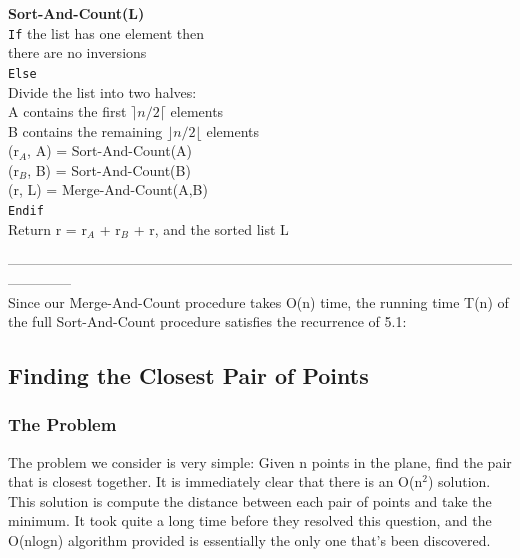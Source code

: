 \documentclass{article}
\begin{document}
\textbf{Sort-And-Count(L)}\\
\texttt{If} the list has one element then\\
there are no inversions\\
\texttt{Else}\\
Divide the list into two halves:\\
A contains the first $\rceil n/2 \lceil$ elements\\
B contains the remaining $\rfloor n/2 \lfloor$ elements\\
(r$_A$, A) = Sort-And-Count(A)\\
(r$_B$, B) = Sort-And-Count(B)\\
(r, L) = Merge-And-Count(A,B)\\
\texttt{Endif}\\
Return r = r$_A$ + r$_B$ + r, and the sorted list L

\medskip

--------------------------------------------------------------------------------------------------------------------------
\medskip
\\

Since our Merge-And-Count procedure takes O(n) time, the running time T(n) of the full Sort-And-Count procedure satisfies the recurrence of 5.1:\\

\medskip




\subsection{Finding the Closest Pair of Points}
\subsubsection{The Problem}
The problem we consider is very simple: Given n points in the plane, find the pair that is closest together. It is immediately clear that there is an O(n$^2$) solution. This solution is compute the distance between each pair of points and take the minimum. It took quite a long time before they resolved this question, and the O(nlogn) algorithm provided is essentially the only one that's been discovered.
\end{document}
